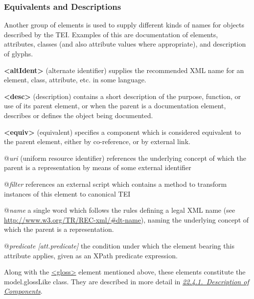 \subsubsection[{Equivalents and Descriptions}]{Equivalents and Descriptions}\label{COHTGED}\par
Another group of elements is used to supply different kinds of names for objects described by the TEI. Examples of this are documentation of elements, attributes, classes (and also attribute values where appropriate), and description of glyphs. 
\begin{sansreflist}
  
\item [\textbf{<altIdent>}] (alternate identifier) supplies the recommended XML name for an element, class, attribute, etc. in some language.
\item [\textbf{<desc>}] (description) contains a short description of the purpose, function, or use of its parent element, or when the parent is a documentation element, describes or defines the object being documented. 
\item [\textbf{<equiv>}] (equivalent) specifies a component which is considered equivalent to the parent element, either by co-reference, or by external link.\hfil\\[-10pt]\begin{sansreflist}
    \item[@{\itshape uri}]
  (uniform resource identifier) references the underlying concept of which the parent is a representation by means of some external identifier
    \item[@{\itshape filter}]
  references an external script which contains a method to transform instances of this element to canonical TEI
    \item[@{\itshape name}]
  a single word which follows the rules defining a legal XML name (see \url{http://www.w3.org/TR/REC-xml/\#dt-name}), naming the underlying concept of which the parent is a representation.
    \item[@{\itshape predicate [att.predicate]}]
  the condition under which the element bearing this attribute applies, given as an XPath predicate expression.
\end{sansreflist}  
\end{sansreflist}
 Along with the \hyperref[TEI.gloss]{<gloss>} element mentioned above, these elements constitute the \textsf{model.glossLike} class. They are described in more detail in \textit{\hyperref[TDcrystalsCEdc]{22.4.1.\ Description of Components}}.
